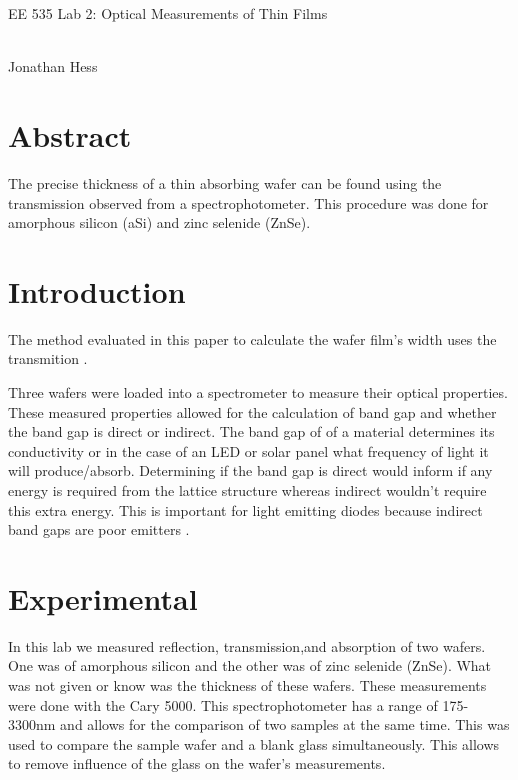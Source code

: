 \documentclass[10pt,a4paper]{article}
\begin{document}
\begin{multicols}{2}
\newenvironment{indentPar}[1]%
 {\begin{list}{}%
         {\setlength{\leftmargin}{#1}}%
         \item[]%
 }
 {\end{list}}

\begin{flushleft}
\begin{LARGE}EE 535 Lab 2: Optical Measurements of Thin Films
\end{LARGE}
\\Jonathan Hess
\end{flushleft}


\section*{Abstract}

The precise thickness of a thin absorbing wafer can be found using the transmission observed from a spectrophotometer. This procedure was done for amorphous silicon (aSi) and zinc selenide (ZnSe).





\section*{Introduction}

The method evaluated in this paper to calculate the wafer film's width uses the transmition . 

Three wafers were loaded into a spectrometer to measure their optical properties. These measured properties allowed for the calculation of band gap and whether the band gap is direct or indirect. The band gap of of a material determines its conductivity or in the case of an LED or solar panel what frequency of light it will produce/absorb. Determining if the band gap is direct would inform if any energy is required from the lattice structure whereas indirect wouldn't require this extra energy. This is important for light emitting diodes because indirect band gaps are poor emitters \cite{Lasers}.




\section*{Experimental}
In this lab we measured reflection, transmission,and absorption of two wafers. One was of amorphous silicon and the other was of zinc selenide (ZnSe). What was not given or know was the thickness of these wafers. These measurements were done with the Cary 5000. This spectrophotometer has a range of 175-3300nm \cite{carry} and allows for the comparison of two samples at the same time. This was used to compare the sample wafer and a blank glass simultaneously. This allows to remove influence of the glass on the wafer's measurements.\\





\end{multicols}
\end{document}
